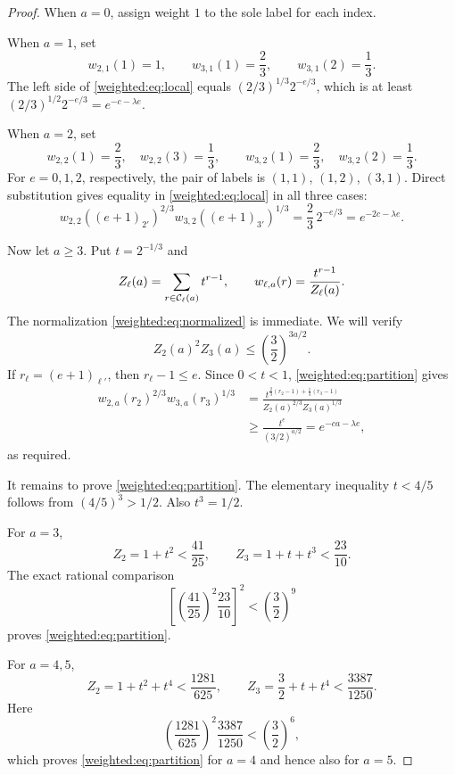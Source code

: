 \begin{proof}
When $a=0$, assign weight $1$ to the sole label for each index.

When $a=1$, set
\[
w_{2,1}(1)=1,\qquad w_{3,1}(1)=\frac23,\qquad w_{3,1}(2)=\frac13.
\]
The left side of \eqref{weighted:eq:local} equals $(2/3)^{1/3}2^{-e/3}$, which is at least $(2/3)^{1/2}2^{-e/3}=e^{-c-\lambda e}$.

When $a=2$, set
\[
w_{2,2}(1)=\frac23,\quad w_{2,2}(3)=\frac13,
\qquad
w_{3,2}(1)=\frac23,\quad w_{3,2}(2)=\frac13.
\]
For $e=0,1,2$, respectively, the pair of labels is $(1,1)$, $(1,2)$, $(3,1)$. Direct substitution gives equality in \eqref{weighted:eq:local} in all three cases:
\[
w_{2,2}((e+1)_{2'})^{2/3}w_{3,2}((e+1)_{3'})^{1/3}
=\frac23\,2^{-e/3}=e^{-2c-\lambda e}.
\]

Now let $a\ge3$. Put $t=2^{-1/3}$ and
\[
Z_\ell(a)=\sum_{r\in\mathcal C_\ell(a)}t^{r-1},\qquad
w_{\ell,a}(r)=\frac{t^{r-1}}{Z_\ell(a)}.
\]
The normalization \eqref{weighted:eq:normalized} is immediate. We will verify
\begin{equation}\label{weighted:eq:partition}
Z_2(a)^2Z_3(a)\le\left(\frac32\right)^{3a/2}.
\end{equation}
If $r_\ell=(e+1)_{\ell'}$, then $r_\ell-1\le e$. Since $0<t<1$, \eqref{weighted:eq:partition} gives
\begin{align*}
w_{2,a}(r_2)^{2/3}w_{3,a}(r_3)^{1/3}
&=\frac{t^{\frac23(r_2-1)+\frac13(r_3-1)}}{Z_2(a)^{2/3}Z_3(a)^{1/3}}\\
&\ge\frac{t^e}{(3/2)^{a/2}}
=e^{-ca-\lambda e},
\end{align*}
as required.

It remains to prove \eqref{weighted:eq:partition}. The elementary inequality $t<4/5$ follows from $(4/5)^3>1/2$. Also $t^3=1/2$.

For $a=3$,
\[
Z_2=1+t^2<\frac{41}{25},\qquad
Z_3=1+t+t^3<\frac{23}{10}.
\]
The exact rational comparison
\begin{equation}\label{weighted:eq:check3}
\left[\left(\frac{41}{25}\right)^2\frac{23}{10}\right]^2
<\left(\frac32\right)^9
\end{equation}
proves \eqref{weighted:eq:partition}.

For $a=4,5$,
\[
Z_2=1+t^2+t^4<\frac{1281}{625},\qquad
Z_3=\frac32+t+t^4<\frac{3387}{1250}.
\]
Here
\begin{equation}\label{weighted:eq:check45}
\left(\frac{1281}{625}\right)^2\frac{3387}{1250}
<\left(\frac32\right)^6,
\end{equation}
which proves \eqref{weighted:eq:partition} for $a=4$ and hence also for $a=5$.


\end{proof}
